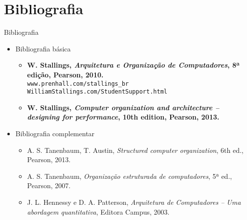    \section[ slide = true]{Bibliografia}
      \begin{slide}[toc=]{Bibliografia}
         \begin{itemize}
            \item Bibliografia básica
            \begin{itemize}
               \item \textbf{W. Stallings, \emph{Arquitetura e Organização de Computadores}, 8ª edição, Pearson,  2010.}\\ \texttt{www.prenhall.com/stallings\_br}\\ \texttt{WilliamStallings.com/StudentSupport.html}
               \item \textbf{W. Stallings, \emph{Computer organization and architecture -- designing for performance}, 10th edition, Pearson,  2013.}
            \end{itemize}
            \item Bibliografia complementar
            \begin{itemize}
               \item {A. S. Tanenbaum, T. Austin, \emph{Structured computer organization}, 6th ed., Pearson, 2013.} 
               \item {A. S. Tanenbaum, \emph{Organização estruturada de computadores}, 5ª ed., Pearson, 2007.} 
               \item J. L. Hennessy e D. A. Patterson, \emph{Arquitetura de Computadores -- Uma abordagem quantitativa}, Editora Campus, 2003.
            \end{itemize}
         \end{itemize}
      \end{slide}

